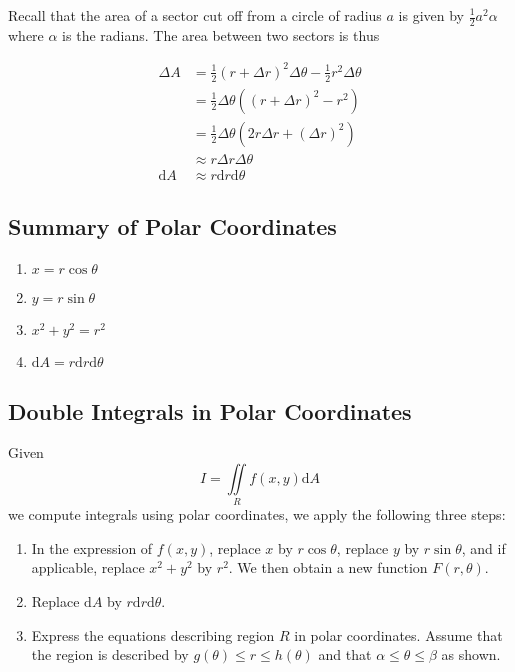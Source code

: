 \documentclass[11pt]{article}
\theoremstyle{plain} %
\theoremstyle{definition}
\theoremstyle{example}
\theoremstyle{remark}
\begin{document}
Recall that the area of a sector cut off from a circle of radius $a$ is given by $\frac{1}{2}a^2\alpha$ where $\alpha$ is the radians. The area between two sectors is thus

\begin{align*}
\Delta A &= \frac{1}{2}(r+\Delta r)^2\Delta \theta - \frac{1}{2} r^2\Delta \theta\\
&= \frac{1}{2}\Delta \theta \left((r+\Delta r)^2 - r^2 \right) \\
&= \frac{1}{2}\Delta \theta \left(2r\Delta r +(\Delta r)^2\right)\\
&\approx r \Delta r \Delta \theta\\
\mathrm d A &\approx r \mathrm d r \mathrm d \theta
\end{align*}

\subsection{Summary of Polar Coordinates}

\begin{enumerate}
	\item $x=r\cos\theta$
	\item $y=r\sin\theta$
	\item $x^2+y^2=r^2$
	\item $\mathrm d A = r\mathrm d r \mathrm d \theta$
\end{enumerate}

\subsection{Double Integrals in Polar Coordinates}
Given $$I = \iint\limits_R f(x,y) \mathrm d A$$we compute integrals using polar coordinates, we apply the following three steps:

\begin{enumerate}
	\item In the expression of $f(x,y)$, replace $x$ by $r\cos\theta$, replace $y$ by $r\sin\theta$, and if applicable, replace $x^2+y^2$ by $r^2$. We then obtain a new function $F(r, \theta)$. 
	\item Replace $\mathrm d A$ by $r\mathrm d r \mathrm d \theta$.
	\item Express the equations describing region $R$ in polar coordinates. Assume that the region is described by $g(\theta) \leq r \leq h(\theta)$ and that $\alpha \leq \theta \leq \beta$ as shown. 
\end{enumerate}
\end{document}
